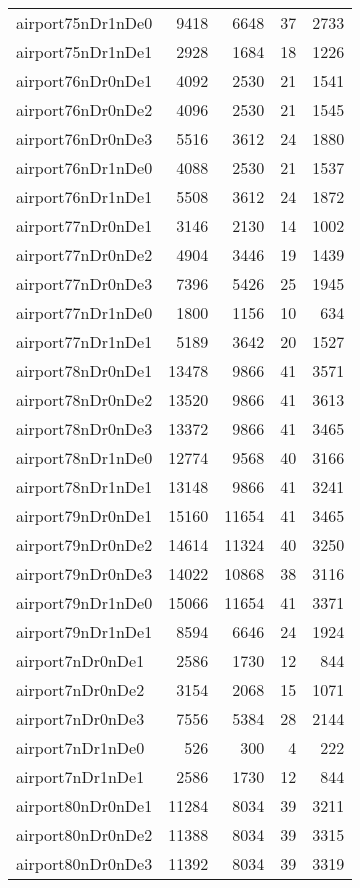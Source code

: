 \begin{tabular}{lrrrr}
airport75nDr1nDe0 & 9418 & 6648 & 37 & 2733 \\
airport75nDr1nDe1 & 2928 & 1684 & 18 & 1226 \\
airport76nDr0nDe1 & 4092 & 2530 & 21 & 1541 \\
airport76nDr0nDe2 & 4096 & 2530 & 21 & 1545 \\
airport76nDr0nDe3 & 5516 & 3612 & 24 & 1880 \\
airport76nDr1nDe0 & 4088 & 2530 & 21 & 1537 \\
airport76nDr1nDe1 & 5508 & 3612 & 24 & 1872 \\
airport77nDr0nDe1 & 3146 & 2130 & 14 & 1002 \\
airport77nDr0nDe2 & 4904 & 3446 & 19 & 1439 \\
airport77nDr0nDe3 & 7396 & 5426 & 25 & 1945 \\
airport77nDr1nDe0 & 1800 & 1156 & 10 & 634 \\
airport77nDr1nDe1 & 5189 & 3642 & 20 & 1527 \\
airport78nDr0nDe1 & 13478 & 9866 & 41 & 3571 \\
airport78nDr0nDe2 & 13520 & 9866 & 41 & 3613 \\
airport78nDr0nDe3 & 13372 & 9866 & 41 & 3465 \\
airport78nDr1nDe0 & 12774 & 9568 & 40 & 3166 \\
airport78nDr1nDe1 & 13148 & 9866 & 41 & 3241 \\
airport79nDr0nDe1 & 15160 & 11654 & 41 & 3465 \\
airport79nDr0nDe2 & 14614 & 11324 & 40 & 3250 \\
airport79nDr0nDe3 & 14022 & 10868 & 38 & 3116 \\
airport79nDr1nDe0 & 15066 & 11654 & 41 & 3371 \\
airport79nDr1nDe1 & 8594 & 6646 & 24 & 1924 \\
airport7nDr0nDe1 & 2586 & 1730 & 12 & 844 \\
airport7nDr0nDe2 & 3154 & 2068 & 15 & 1071 \\
airport7nDr0nDe3 & 7556 & 5384 & 28 & 2144 \\
airport7nDr1nDe0 & 526 & 300 & 4 & 222 \\
airport7nDr1nDe1 & 2586 & 1730 & 12 & 844 \\
airport80nDr0nDe1 & 11284 & 8034 & 39 & 3211 \\
airport80nDr0nDe2 & 11388 & 8034 & 39 & 3315 \\
airport80nDr0nDe3 & 11392 & 8034 & 39 & 3319 \\

\end{tabular}
